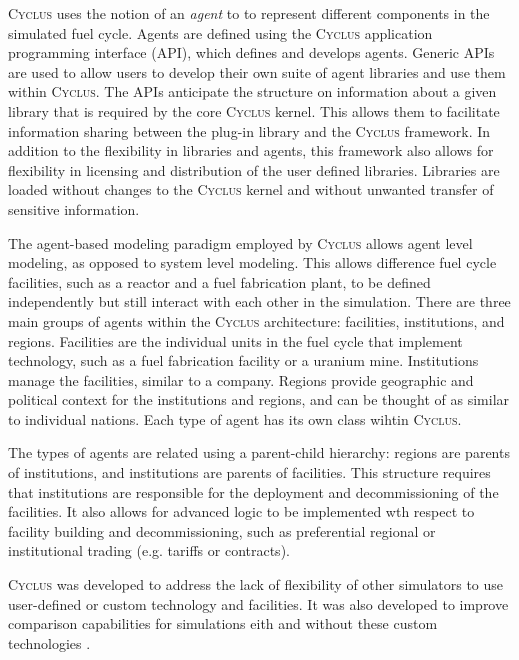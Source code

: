 \documentclass{article}
\newcommand{\Cyclus}{\textsc{Cyclus}\xspace}%
\begin{document}
    \Cyclus uses the notion of an \textit{agent} to to represent different 
    components in the simulated fuel cycle. Agents are 
    defined using the \Cyclus application programming interface (API), which 
    defines and develops agents. Generic APIs are used to allow users 
    to develop their own suite of agent libraries and use them within \Cyclus. 
    The APIs anticipate the structure on information about a given library 
    that is required by the core \Cyclus kernel. This allows them to facilitate 
    information sharing between the plug-in library and the \Cyclus framework. 
    In addition to the flexibility in libraries and agents, this framework 
    also allows for flexibility in licensing and distribution of the user 
    defined libraries. Libraries are loaded without changes to the \Cyclus 
    kernel and without unwanted transfer of sensitive information. 

    The agent-based modeling paradigm employed by \Cyclus allows agent level 
    modeling, as opposed to system level modeling. This allows difference 
    fuel cycle facilities, such as a reactor and a fuel fabrication plant, to 
    be defined independently but still interact with each other in the 
    simulation. There are three main groups of agents within the \Cyclus 
    architecture: facilities, institutions, and regions. Facilities are 
    the individual units in the fuel cycle that implement technology, 
    such as a fuel fabrication facility or a uranium mine. Institutions 
    manage the facilities, similar to a company. Regions provide geographic 
    and political context for the institutions and regions, and can be thought 
    of as similar to individual nations. Each type of agent has its own 
    class wihtin \Cyclus. 

    The types of agents are related using a parent-child hierarchy: regions are
    parents of institutions, and institutions are parents of facilities. This 
    structure requires that institutions are responsible for the deployment 
    and decommissioning of the facilities. It also allows for advanced logic 
    to be implemented wth respect to facility building and decommissioning, 
    such as preferential regional or institutional trading (e.g. tariffs or 
    contracts). 

    \Cyclus was developed to address the lack of flexibility of other 
    simulators to use user-defined or custom technology and facilities. It 
    was also developed to improve comparison capabilities for simulations 
    eith and without these custom technologies \cite{huff_fundamental_2016}. 
\end{document}
